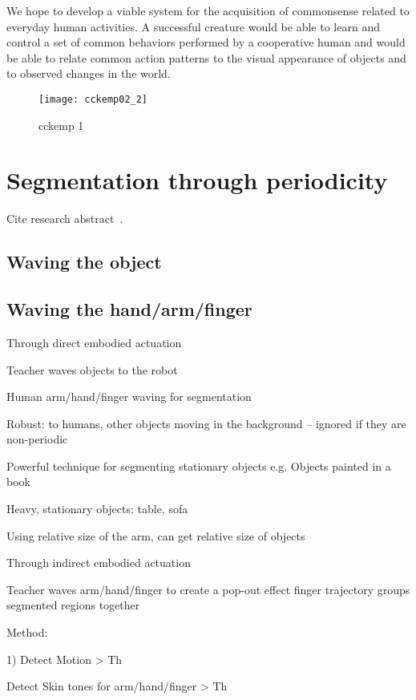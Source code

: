 We hope to develop a viable system for the acquisition of commonsense
related to everyday human activities. A successful creature would be
able to learn and control a set of common behaviors performed by a
cooperative human and would be able to relate common action patterns
to the visual appearance of objects and to observed changes in the
world.

\begin{figure}[bt]
\texttt{[image: cckemp02\_2]}
\caption
{
cckemp 1
}
\label{fig:cckemp1}
\end{figure}



\section{Segmentation through periodicity}

Cite research abstract~\citep{arsenio02boosting}.

\subsection{Waving the object}

\subsection{Waving the hand/arm/finger}

Through direct embodied actuation

  Teacher waves objects to the robot

Human arm/hand/finger waving for segmentation

Robust: to humans, other objects moving in the background --
ignored if they are non-periodic

Powerful technique for segmenting stationary objects e.g. Objects
painted in a book

Heavy, stationary objects: table, sofa

Using relative size of the arm, can get relative size of objects

Through indirect embodied actuation

 Teacher waves arm/hand/finger to create a pop-out effect
       finger trajectory groups segmented regions together

Method:

1)  Detect Motion > Th

     Detect Skin tones for arm/hand/finger  > Th

